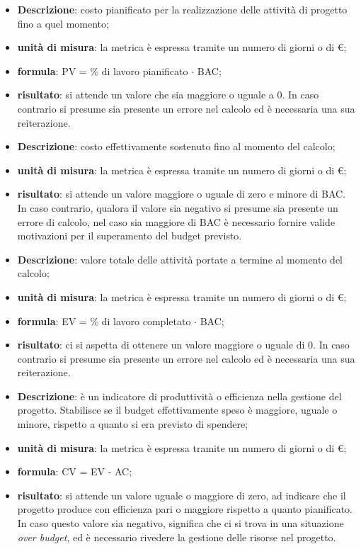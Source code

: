 		\begin{itemize}
			\item \textbf{Descrizione}: costo pianificato per la realizzazione delle attività di progetto fino a quel momento;
			\item \textbf{unità di misura}: la metrica è espressa tramite un numero di giorni o di \euro;
			\item \textbf{formula}: PV = \% di lavoro pianificato $\cdot{}$ BAC;
			\item \textbf{risultato}: si attende un valore che sia maggiore o uguale a 0. In caso contrario si presume sia presente un errore nel calcolo ed è necessaria una sua reiterazione.
		\end{itemize}
		\begin{itemize}
			\item \textbf{Descrizione}: costo effettivamente sostenuto fino al momento del calcolo;
			\item \textbf{unità di misura}: la metrica è espressa tramite un numero di giorni o di \euro;
			\item \textbf{risultato}: si attende un valore maggiore o uguale di zero e minore di BAC. In caso contrario, qualora il valore sia negativo si presume sia presente un errore di calcolo, nel caso sia maggiore di BAC è necessario fornire valide motivazioni per il superamento del budget previsto.
		\end{itemize}
		\begin{itemize}
			\item \textbf{Descrizione}: valore totale delle attività portate a termine al momento del calcolo;
			\item \textbf{unità di misura}: la metrica è espressa tramite un numero di giorni o di \euro;
			\item \textbf{formula}: EV = \% di lavoro completato $\cdot{}$ BAC;
			\item \textbf{risultato}: ci si aspetta di ottenere un valore maggiore o uguale di 0. In caso contrario si presume sia presente un errore nel calcolo ed è necessaria una sua reiterazione.
		\end{itemize}
		\begin{itemize}
			\item \textbf{Descrizione}: è un indicatore di produttività o efficienza nella gestione del progetto. Stabilisce se il budget effettivamente speso è maggiore, uguale o minore, rispetto a quanto si era previsto di spendere;
			\item \textbf{unità di misura}: la metrica è espressa tramite un numero di giorni o di \euro;
			\item \textbf{formula}: CV = EV - AC;
			\item \textbf{risultato}: si attende un valore uguale o maggiore di zero, ad indicare che il progetto produce con efficienza pari o maggiore rispetto a quanto pianificato. In caso questo valore sia negativo, significa che ci si trova in una situazione \textit{over budget}, ed è necessario rivedere la gestione delle risorse nel progetto.
		\end{itemize}
